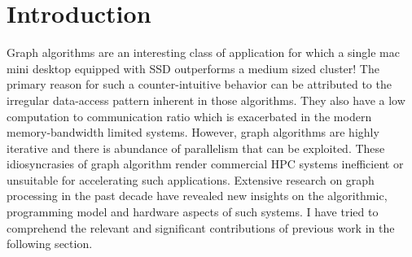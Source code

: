 \section{Introduction}
Graph algorithms are an interesting class of application for which a single mac mini desktop equipped with SSD outperforms a medium sized cluster! \cite{GraphChi} The primary reason for such a counter-intuitive behavior can be attributed to the irregular data-access pattern inherent in those algorithms. They also have a low computation to communication ratio which is exacerbated in the modern memory-bandwidth limited systems. However, graph algorithms are highly iterative and there is abundance of parallelism that can be exploited. These idiosyncrasies of graph algorithm render commercial HPC systems inefficient or unsuitable for accelerating such applications. Extensive research on graph processing in the past decade have revealed new insights on the algorithmic, programming model and hardware aspects of such systems. I have tried to comprehend the relevant and significant contributions of previous work in the following section.
